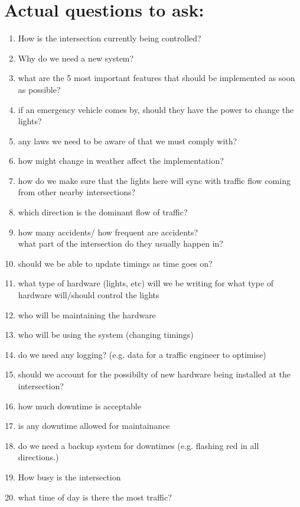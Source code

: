 \documentclass[letterpaper]{article}
\begin{document}
\section{Actual questions to ask:}
\begin{enumerate}
 \item How is the intersection currently being controlled?
 \item Why do we need a new system?
 \item what are the 5 most important features that should be implemented as soon as possible?
 \item if an emergency vehicle comes by, should they have the power to change the lights?
 \item any laws we need to be aware of that we must comply with?
 \item how might change in weather affect the implementation?
 \item how do we make sure that the lights here will sync with traffic flow
       coming from other nearby intersections?
 \item which direction is the dominant flow of traffic?
 \item how many accidents/ how frequent are accidents?\\
       what part of the intersection do they usually happen in?
 \item should we be able to update timings as time goes on?
 \item what type of hardware (lights, etc) will we be writing for
       what type of hardware will/should control the lights
 \item who will be maintaining the hardware
 \item who will be using the system (changing timings)
 \item do we need any logging? (e.g. data for a traffic engineer to optimise)
 \item should we account for the possibilty of new hardware being installed at the intersection?
 \item how much downtime is acceptable
 \item is any downtime allowed for maintainance
 \item do we need a backup system for downtimes (e.g. flashing red in all directions.)
       
       
       
 \item How busy is the intersection
 \item what time of day is there the most traffic?
       

\end{enumerate}
\end{document}
